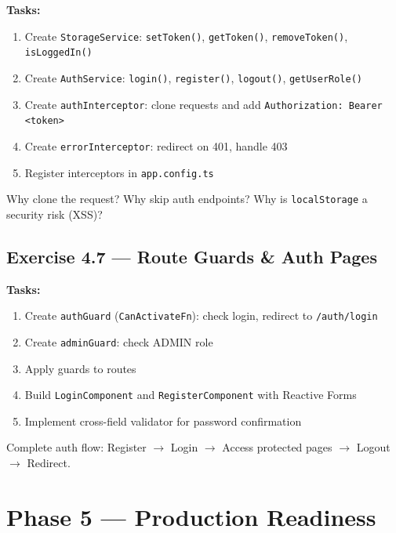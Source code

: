 \documentclass[12pt,a4paper]{report}
\begin{document}
\textbf{Tasks:}
\begin{enumerate}
    \item Create \texttt{StorageService}: \texttt{setToken()}, \texttt{getToken()}, \texttt{removeToken()}, \texttt{isLoggedIn()}
    \item Create \texttt{AuthService}: \texttt{login()}, \texttt{register()}, \texttt{logout()}, \texttt{getUserRole()}
    \item Create \texttt{authInterceptor}: clone requests and add \texttt{Authorization: Bearer <token>}
    \item Create \texttt{errorInterceptor}: redirect on 401, handle 403
    \item Register interceptors in \texttt{app.config.ts}
\end{enumerate}

\begin{thinkbox}
Why clone the request? Why skip auth endpoints? Why is \texttt{localStorage} a security risk (XSS)?
\end{thinkbox}

\section{Exercise 4.7 --- Route Guards \& Auth Pages}

\textbf{Tasks:}
\begin{enumerate}
    \item Create \texttt{authGuard} (\texttt{CanActivateFn}): check login, redirect to \texttt{/auth/login}
    \item Create \texttt{adminGuard}: check ADMIN role
    \item Apply guards to routes
    \item Build \texttt{LoginComponent} and \texttt{RegisterComponent} with Reactive Forms
    \item Implement cross-field validator for password confirmation
\end{enumerate}

\begin{checkpoint}
Complete auth flow: Register $\to$ Login $\to$ Access protected pages $\to$ Logout $\to$ Redirect.
\end{checkpoint}

\chapter{Phase 5 --- Production Readiness}
\end{document}
